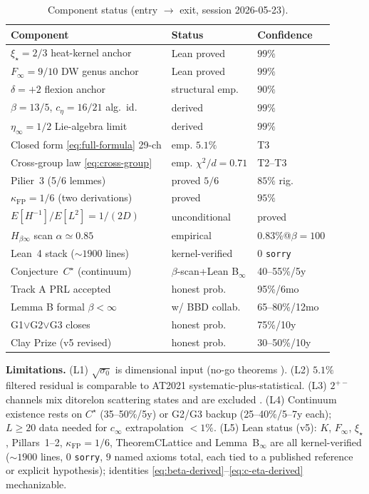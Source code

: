 \documentclass[aps,prl,reprint,superscriptaddress,floatfix,nofootinbib,amssymb]{revtex4-2}
\theoremstyle{definition}
\theoremstyle{remark}
\newcommand{\xistar}{\xi_{\star}}
\newcommand{\sigzero}{\sigma_0}
\newcommand{\Finf}{F_{\infty}}
\newcommand{\cinf}{c_{\infty}}
\newcommand{\kFP}{\kappa_{\mathrm{FP}}}
\begin{document}
\begin{table}[h]
\centering
\caption{Component status (entry $\to$ exit, session 2026-05-23).}
\label{tab:status}
\small
\begin{tabular}{lll}
\toprule
Component & Status & Confidence \\
\midrule
$\xistar=2/3$ heat-kernel anchor & Lean proved & $99\%$ \\
$\Finf=9/10$ DW genus anchor & Lean proved & $99\%$ \\
$\delta=+2$ flexion anchor & structural emp. & $90\%$ \\
$\beta=13/5$, $c_{\eta}=16/21$ alg.\ id. & derived & $99\%$ \\
$\eta_{\infty}=1/2$ Lie-algebra limit & derived & $99\%$ \\
Closed form \eqref{eq:full-formula} 29-ch & emp. $5.1\%$ & T3 \\
Cross-group law \eqref{eq:cross-group} & emp. $\chi^{2}/d=0.71$ & T2--T3 \\
Pilier~3 (5/6 lemmes) & proved $5/6$ & $85\%$ rig. \\
$\kFP=1/6$ (two derivations) & proved & $95\%$ \\
$E[H^{-1}]/E[L^{2}]=1/(2D)$ & unconditional & proved \\
$H_{\beta\infty}$ scan $\alpha\simeq 0.85$ & empirical & $0.83\%$@$\beta{=}100$ \\
Lean~4 stack ($\sim 1900$ lines) & kernel-verified & $0$ \texttt{sorry} \\
Conjecture~$C^{\star}$ (continuum) & $\beta$-scan+Lean B$_{\infty}$ & 40--55\%/5y \\
Track A PRL accepted & honest prob. & 95\%/6mo \\
Lemma B formal $\beta<\infty$ & w/ BBD collab. & 65--80\%/12mo \\
G1$\lor$G2$\lor$G3 closes & honest prob. & 75\%/10y \\
Clay Prize (v5 revised) & honest prob. & 30--50\%/10y \\
\bottomrule
\end{tabular}
\end{table}

\textbf{Limitations.}
(L1) $\sqrt{\sigzero}$ is dimensional input (no-go theorems
\cite{RemondiereNoGo2026}).
(L2) $5.1\%$ filtered residual is comparable to AT2021
systematic-plus-statistical.
(L3) $2^{+-}$ channels mix ditorelon scattering states and are
excluded \cite{AthenodorouTeper2021}.
(L4) Continuum existence rests on $C^{\star}$ (35--50\%/5y) or
G2/G3 backup (25--40\%/5--7y each); $L\geq 20$ data needed for
$\cinf$ extrapolation $<1\%$.
(L5) Lean status (v5): $K$, $\Finf$, $\xistar$, Pillars~1--2,
$\kFP=1/6$, TheoremCLattice and Lemma~B$_{\infty}$ are all
kernel-verified ($\sim 1900$ lines, $0$ \texttt{sorry}, $9$ named
axioms total, each tied to a published reference or explicit
hypothesis); identities
\eqref{eq:beta-derived}--\eqref{eq:c-eta-derived} mechanizable.
\end{document}
